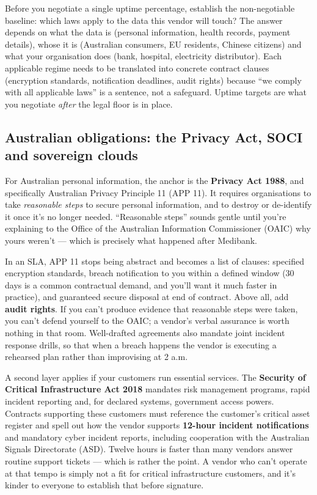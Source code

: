 Before you negotiate a single uptime percentage, establish the non-negotiable baseline: which laws apply to the data this vendor will touch? The answer depends on what the data is (personal information, health records, payment details), whose it is (Australian consumers, EU residents, Chinese citizens) and what your organisation does (bank, hospital, electricity distributor). Each applicable regime needs to be translated into concrete contract clauses (encryption standards, notification deadlines, audit rights) because ``we comply with all applicable laws'' is a sentence, not a safeguard. Uptime targets are what you negotiate \emph{after} the legal floor is in place.



\subsection{Australian obligations: the Privacy Act, SOCI and sovereign clouds}


For Australian personal information, the anchor is the \textbf{Privacy Act 1988}, and specifically Australian Privacy Principle 11 (APP 11). It requires organisations to take \emph{reasonable steps} to secure personal information, and to destroy or de-identify it once it's no longer needed. ``Reasonable steps'' sounds gentle until you're explaining to the Office of the Australian Information Commissioner (OAIC) why yours weren't — which is precisely what happened after Medibank.


In an SLA, APP 11 stops being abstract and becomes a list of clauses: specified encryption standards, breach notification to you within a defined window (30 days is a common contractual demand, and you'll want it much faster in practice), and guaranteed secure disposal at end of contract. Above all, add \textbf{audit rights}. If you can't produce evidence that reasonable steps were taken, you can't defend yourself to the OAIC; a vendor's verbal assurance is worth nothing in that room. Well-drafted agreements also mandate joint incident response drills, so that when a breach happens the vendor is executing a rehearsed plan rather than improvising at 2 a.m.


A second layer applies if your customers run essential services. The \textbf{Security of Critical Infrastructure Act 2018} mandates risk management programs, rapid incident reporting and, for declared systems, government access powers. Contracts supporting these customers must reference the customer's critical asset register and spell out how the vendor supports \textbf{12-hour incident notifications} and mandatory cyber incident reports, including cooperation with the Australian Signals Directorate (ASD). Twelve hours is faster than many vendors answer routine support tickets — which is rather the point. A vendor who can't operate at that tempo is simply not a fit for critical infrastructure customers, and it's kinder to everyone to establish that before signature.


